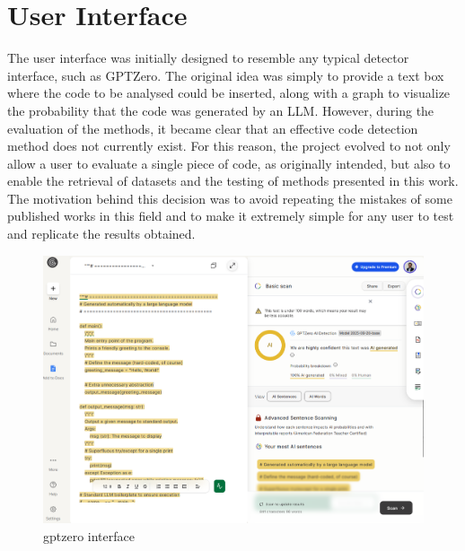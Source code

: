 \chapter{User Interface}
The user interface was initially designed to resemble any typical 
detector interface, such as GPTZero. The original idea was simply 
to provide a text box where the code to be analysed could be inserted, 
along with a graph to visualize the probability that the code was 
generated by an LLM. However, during the evaluation of the methods, 
it became clear that an effective code detection method does not 
currently exist. For this reason, the project evolved to not only 
allow a user to evaluate a single piece of code, as originally 
intended, but also to enable the retrieval of datasets and the 
testing of methods presented in this work. The motivation behind 
this decision was to avoid repeating the mistakes of some published 
works in this field and to make it extremely simple for any user to 
test and replicate the results obtained.


\begin{figure}[H]
    \centering
    \includegraphics[width=0.8\linewidth]{img/gptzero.png}
    \caption{gptzero interface}
    \label{fig:gptzero}
\end{figure}


%